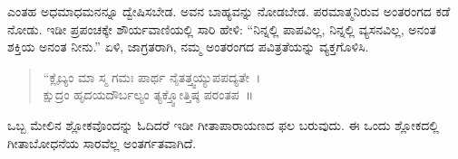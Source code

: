 ಎಂತಹ ಅಧಮಾಧಮನನ್ನೂ ದ್ವೇಷಿಸಬೇಡ. ಅವನ ಬಾಹ್ಯವನ್ನು ನೋಡಬೇಡ. ಪರಮಾತ್ಮನಿರುವ ಅಂತರಂಗದ ಕಡೆ ನೋಡು. ಇಡೀ ಪ್ರಪಂಚಕ್ಕೇ ಶೌರ್ಯವಾಣಿಯಲ್ಲಿ ಸಾರಿ ಹೇಳಿ: “ನಿನ್ನಲ್ಲಿ ಪಾಪವಿಲ್ಲ, ನಿನ್ನಲ್ಲಿ ವ್ಯಸನವಿಲ್ಲ, ಅನಂತ ಶಕ್ತಿಯ ಅನಂತ ನೀನು.” ಏಳಿ, ಜಾಗ್ರತರಾಗಿ, ನಮ್ಮ ಅಂತರಂಗದ ಪವಿತ್ರತೆಯನ್ನು ವ್ಯಕ್ತಗೊಳಿಸಿ.

\begin{verse}
 “ಕ್ಲೈಬ್ಯಂ ಮಾ ಸ್ಮ ಗಮಃ ಪಾರ್ಥ ನೈತತ್ತ್ವಯ್ಯುಪಪದ್ಯತೇ~।\\
 ಕ್ಷುದ್ರಂ ಹೃದಯದೌರ್ಬಲ್ಯಂ ತ್ಯಕ್ತ್ವೋತ್ತಿಷ್ಠ ಪರಂತಪ~॥
\end{verse}

ಒಬ್ಬ ಮೇಲಿನ ಶ್ಲೋಕವೊಂದನ್ನು ಓದಿದರೆ ಇಡೀ ಗೀತಾಪಾರಾಯಣದ ಫಲ ಬರುವುದು. ಈ ಒಂದು ಶ್ಲೋಕದಲ್ಲಿ ಗೀತಾಬೋಧನೆಯ ಸಾರವೆಲ್ಲ ಅಂತರ್ಗತವಾಗಿದೆ.

